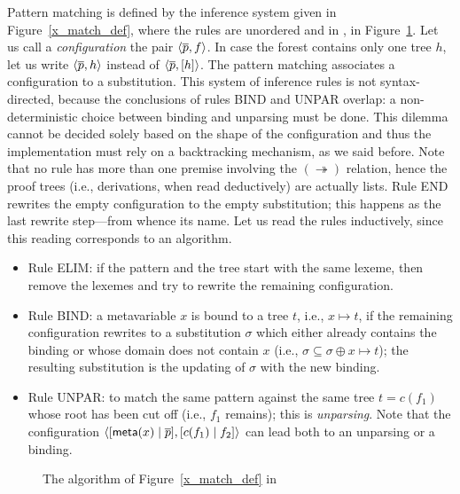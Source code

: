 Pattern matching is defined by the inference system given in
Figure~\ref{x_match_def}, where the rules are unordered and in
\Prolog, in Figure~\ref{x_match_prolog}. Let us call a
\emph{configuration} the pair \(\smat{f}{\overline{p}}\). In case the
forest contains only one tree \(h\), let us write
\(\smat{h}{\overline{p}}\) instead of
\(\smat{[h]}{\overline{p}}\). The pattern matching associates a
configuration to a substitution. This system of inference rules is not
syntax\hyp{}directed, because the conclusions of rules \textsf{BIND}
and \textsf{UNPAR} overlap: a non\hyp{}deterministic choice between
binding and unparsing must be done. This dilemma cannot be decided
solely based on the shape of the configuration and thus the
implementation must rely on a backtracking mechanism, as we said
before. Note that no rule has more than one premise involving the
\((\twoheadrightarrow)\) relation, hence the proof trees (i.e.,
derivations, when read deductively) are actually lists. Rule
\textsf{END} rewrites the empty configuration to the empty
substitution; this happens as the last rewrite step---from whence its
name. Let us read the rules inductively, since this reading
corresponds to an algorithm.
\begin{itemize}

  \item Rule \textsf{ELIM}: if the pattern and the tree start with the
    same lexeme, then remove the lexemes and try to rewrite the
    remaining configuration.

  \item Rule \textsf{BIND}: a meta\-variable \(x\) is bound to a tree
    \(t\), i.e., \(x \mapsto t\), if the remaining configuration
    rewrites to a substitution \(\sigma\) which either already
    contains the binding or whose domain does not contain \(x\) (i.e.,
    \(\sigma \subseteq \sigma \oplus x \mapsto t\)); the resulting
    substitution is the updating of \(\sigma\) with the new binding.

  \item Rule \textsf{UNPAR}: to match the same pattern against the
    same tree \(t = c(f_1)\) whose root has been cut off (i.e.,
    \(f_1\) remains); this is \emph{unparsing}. Note that the
    configuration
    \(\smat{\cons{c(f_1)}{f_2}}{\cons{\meta{x}}{\overline{p}}}\) can
    lead both to an unparsing or a binding.
\end{itemize}
\begin{figure}[t]
\caption{The algorithm of Figure~\ref{x_match_def} in
  \Prolog\label{x_match_prolog}}
\end{figure}
